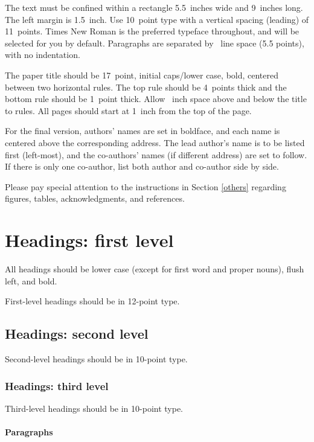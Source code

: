 \documentclass[a4paper]{article}
\begin{document}
The text must be confined within a rectangle 5.5~inches wide and
9~inches long. The left margin is 1.5~inch.  Use 10~point
type with a vertical spacing (leading) of 11~points.  Times New Roman is the
preferred typeface throughout, and will be selected for you by default.
Paragraphs are separated by ~line space (5.5 points), with no
indentation.


The paper title should be 17~point, initial caps/lower case, bold, centered
between two horizontal rules. The top rule should be 4~points thick and the
bottom rule should be 1~point thick. Allow ~inch space above and
below the title to rules. All pages should start at 1~inch from the
top of the page.


For the final version, authors' names are set in boldface, and each name is
centered above the corresponding address. The lead author's name is to be listed
first (left-most), and the co-authors' names (if different address) are set to
follow. If there is only one co-author, list both author and co-author side by
side.


Please pay special attention to the instructions in Section \ref{others}
regarding figures, tables, acknowledgments, and references.


\section{Headings: first level}
\label{headings}


All headings should be lower case (except for first word and proper nouns),
flush left, and bold.


First-level headings should be in 12-point type.


\subsection{Headings: second level}


Second-level headings should be in 10-point type.


\subsubsection{Headings: third level}


Third-level headings should be in 10-point type.


\paragraph{Paragraphs}
\end{document}

